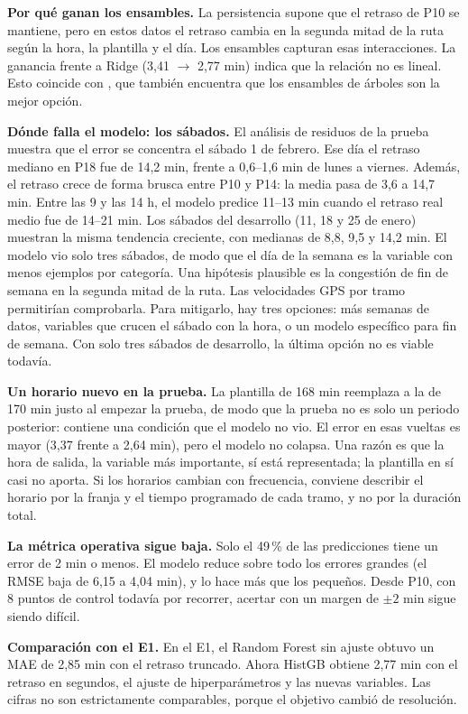 \documentclass[conference,spanish]{IEEEtran}
\begin{document}
\textbf{Por qué ganan los ensambles.} La persistencia supone que el retraso de P10 se mantiene, pero en estos datos el retraso cambia en la segunda mitad de la ruta según la hora, la plantilla y el día. Los ensambles capturan esas interacciones. La ganancia frente a Ridge (3,41 $\to$ 2,77 min) indica que la relación no es lineal. Esto coincide con \cite{martyanov2026}, que también encuentra que los ensambles de árboles son la mejor opción.

\textbf{Dónde falla el modelo: los sábados.} El análisis de residuos de la prueba muestra que el error se concentra el sábado 1 de febrero. Ese día el retraso mediano en P18 fue de 14,2 min, frente a 0,6--1,6 min de lunes a viernes. Además, el retraso crece de forma brusca entre P10 y P14: la media pasa de 3,6 a 14,7 min. Entre las 9 y las 14 h, el modelo predice 11--13 min cuando el retraso real medio fue de 14--21 min. Los sábados del desarrollo (11, 18 y 25 de enero) muestran la misma tendencia creciente, con medianas de 8,8, 9,5 y 14,2 min. El modelo vio solo tres sábados, de modo que el día de la semana es la variable con menos ejemplos por categoría. Una hipótesis plausible es la congestión de fin de semana en la segunda mitad de la ruta. Las velocidades GPS por tramo permitirían comprobarla. Para mitigarlo, hay tres opciones: más semanas de datos, variables que crucen el sábado con la hora, o un modelo específico para fin de semana. Con solo tres sábados de desarrollo, la última opción no es viable todavía.

\textbf{Un horario nuevo en la prueba.} La plantilla de 168 min reemplaza a la de 170 min justo al empezar la prueba, de modo que la prueba no es solo un periodo posterior: contiene una condición que el modelo no vio. El error en esas vueltas es mayor (3,37 frente a 2,64 min), pero el modelo no colapsa. Una razón es que la hora de salida, la variable más importante, sí está representada; la plantilla en sí casi no aporta. Si los horarios cambian con frecuencia, conviene describir el horario por la franja y el tiempo programado de cada tramo, y no por la duración total.

\textbf{La métrica operativa sigue baja.} Solo el 49\,\% de las predicciones tiene un error de 2 min o menos. El modelo reduce sobre todo los errores grandes (el RMSE baja de 6,15 a 4,04 min), y lo hace más que los pequeños. Desde P10, con 8 puntos de control todavía por recorrer, acertar con un margen de $\pm2$ min sigue siendo difícil.

\textbf{Comparación con el E1.} En el E1, el Random Forest sin ajuste obtuvo un MAE de 2,85 min con el retraso truncado. Ahora HistGB obtiene 2,77 min con el retraso en segundos, el ajuste de hiperparámetros y las nuevas variables. Las cifras no son estrictamente comparables, porque el objetivo cambió de resolución.
\end{document}
